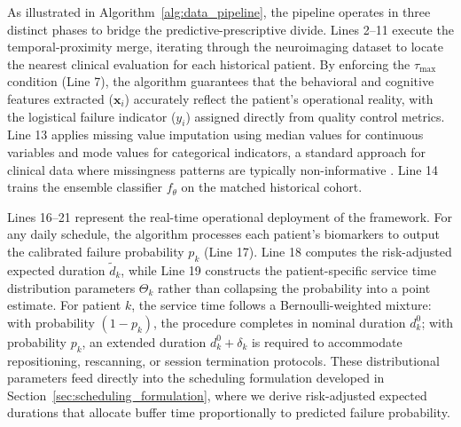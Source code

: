 \documentclass[msom,blindrev]{informs3}
\begin{document}
As illustrated in Algorithm~\ref{alg:data_pipeline}, the pipeline operates in three distinct phases to bridge the predictive-prescriptive divide. Lines 2--11 execute the temporal-proximity merge, iterating through the neuroimaging dataset to locate the nearest clinical evaluation for each historical patient. By enforcing the $\tau_{\max}$ condition (Line 7), the algorithm guarantees that the behavioral and cognitive features extracted ($\mathbf{x}_i$) accurately reflect the patient's operational reality, with the logistical failure indicator ($y_i$) assigned directly from quality control metrics. Line 13 applies missing value imputation using median values for continuous variables and mode values for categorical indicators, a standard approach for clinical data where missingness patterns are typically non-informative \citep{sterne2009multiple}. Line 14 trains the ensemble classifier $f_{\theta}$ on the matched historical cohort.

Lines 16--21 represent the real-time operational deployment of the framework. For any daily schedule, the algorithm processes each patient's biomarkers to output the calibrated failure probability $p_k$ (Line 17). Line 18 computes the risk-adjusted expected duration $\tilde{d}_k$, while Line 19 constructs the patient-specific service time distribution parameters $\Theta_k$ rather than collapsing the probability into a point estimate. For patient $k$, the service time follows a Bernoulli-weighted mixture: with probability $(1 - p_k)$, the procedure completes in nominal duration $d_k^0$; with probability $p_k$, an extended duration $d_k^0 + \delta_k$ is required to accommodate repositioning, rescanning, or session termination protocols. These distributional parameters feed directly into the scheduling formulation developed in Section~\ref{sec:scheduling_formulation}, where we derive risk-adjusted expected durations that allocate buffer time proportionally to predicted failure probability.
\end{document}
